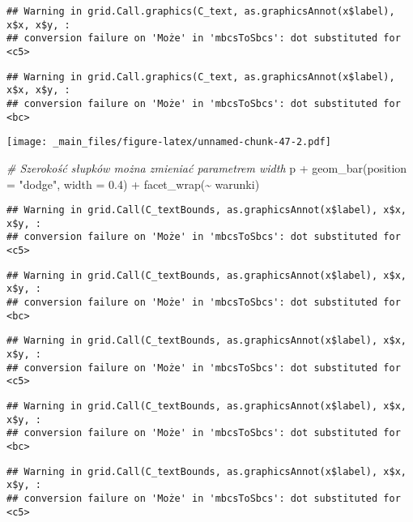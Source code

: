 \documentclass[
]{book}
\newenvironment{Shaded}{\begin{snugshade}}{\end{snugshade}}
\newcommand{\AttributeTok}[1]{\textcolor[rgb]{0.77,0.63,0.00}{#1}}
\newcommand{\CommentTok}[1]{\textcolor[rgb]{0.56,0.35,0.01}{\textit{#1}}}
\newcommand{\FloatTok}[1]{\textcolor[rgb]{0.00,0.00,0.81}{#1}}
\newcommand{\FunctionTok}[1]{\textcolor[rgb]{0.00,0.00,0.00}{#1}}
\newcommand{\NormalTok}[1]{#1}
\newcommand{\SpecialCharTok}[1]{\textcolor[rgb]{0.00,0.00,0.00}{#1}}
\newcommand{\StringTok}[1]{\textcolor[rgb]{0.31,0.60,0.02}{#1}}
\begin{document}
\begin{verbatim}
## Warning in grid.Call.graphics(C_text, as.graphicsAnnot(x$label), x$x, x$y, :
## conversion failure on 'Może' in 'mbcsToSbcs': dot substituted for <c5>
\end{verbatim}

\begin{verbatim}
## Warning in grid.Call.graphics(C_text, as.graphicsAnnot(x$label), x$x, x$y, :
## conversion failure on 'Może' in 'mbcsToSbcs': dot substituted for <bc>
\end{verbatim}

\texttt{[image: \_main\_files/figure-latex/unnamed-chunk-47-2.pdf]}

\begin{Shaded}
\begin{Highlighting}[]
\CommentTok{\# Szerokość słupków można zmieniać parametrem width}
\NormalTok{p }\SpecialCharTok{+} \FunctionTok{geom\_bar}\NormalTok{(}\AttributeTok{position =} \StringTok{"dodge"}\NormalTok{, }\AttributeTok{width =} \FloatTok{0.4}\NormalTok{) }\SpecialCharTok{+} \FunctionTok{facet\_wrap}\NormalTok{(}\SpecialCharTok{\textasciitilde{}}\NormalTok{ warunki)}
\end{Highlighting}
\end{Shaded}

\begin{verbatim}
## Warning in grid.Call(C_textBounds, as.graphicsAnnot(x$label), x$x, x$y, :
## conversion failure on 'Może' in 'mbcsToSbcs': dot substituted for <c5>
\end{verbatim}

\begin{verbatim}
## Warning in grid.Call(C_textBounds, as.graphicsAnnot(x$label), x$x, x$y, :
## conversion failure on 'Może' in 'mbcsToSbcs': dot substituted for <bc>
\end{verbatim}

\begin{verbatim}
## Warning in grid.Call(C_textBounds, as.graphicsAnnot(x$label), x$x, x$y, :
## conversion failure on 'Może' in 'mbcsToSbcs': dot substituted for <c5>
\end{verbatim}

\begin{verbatim}
## Warning in grid.Call(C_textBounds, as.graphicsAnnot(x$label), x$x, x$y, :
## conversion failure on 'Może' in 'mbcsToSbcs': dot substituted for <bc>
\end{verbatim}

\begin{verbatim}
## Warning in grid.Call(C_textBounds, as.graphicsAnnot(x$label), x$x, x$y, :
## conversion failure on 'Może' in 'mbcsToSbcs': dot substituted for <c5>
\end{verbatim}
\end{document}
